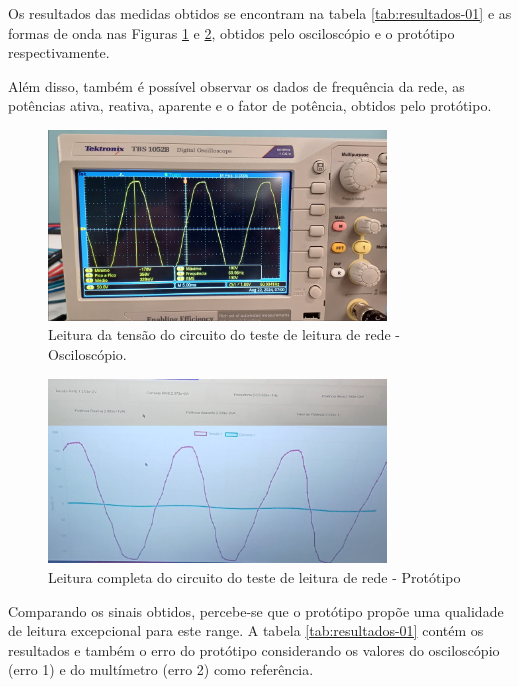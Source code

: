 Os resultados das medidas obtidos se encontram na tabela \autoref{tab:resultados-01} e as formas de onda nas Figuras \ref{fig:leitura-rede-osc} e \ref{fig:leitura-rede-boy-ondas}, obtidos pelo osciloscópio e o protótipo respectivamente. 

Além disso, também é possível observar os dados de frequência da rede, as potências ativa, reativa, aparente e o fator de potência, obtidos pelo protótipo.

\begin{figure}[htb!]
    \caption{Leitura da tensão do circuito do teste de leitura de rede - Osciloscópio.}
    \label{fig:leitura-rede-osc}
    \includegraphics[width=0.8\textwidth]{figuras/leitura-rede-osc.png}
    \fonte{}
\end{figure}

\begin{figure}[htb!]
    \caption{Leitura completa do circuito do teste de leitura de rede - Protótipo}
    \label{fig:leitura-rede-boy-ondas}
    \includegraphics[width=0.8\textwidth]{figuras/leitura-rede-boy-ondas.png}
    \fonte{}
\end{figure}

Comparando os sinais obtidos, percebe-se que o protótipo propõe uma qualidade de leitura excepcional para este range. A tabela \autoref{tab:resultados-01} contém os resultados e também o erro do protótipo considerando os valores do osciloscópio (erro 1) e do multímetro (erro 2) como referência.

